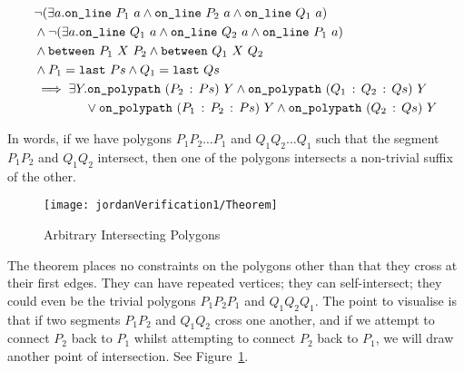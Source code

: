 \begin{equation}\label{eq:intersectPolypathClosed}
  \begin{aligned}
    &\neg(\exists a.\texttt{on\_line}\ P_1\ a\wedge \texttt{on\_line}\ P_2\ a\wedge \texttt{on\_line}\ Q_1\ a)\\
    &\wedge\neg(\exists a.\texttt{on\_line}\ Q_1\ a\wedge \texttt{on\_line}\ Q_2\ a\wedge \texttt{on\_line}\ P_1\ a)\\
    &\wedge\texttt{between}\ P_1\ X\ P_2 \wedge \texttt{between}\ Q_1\ X\ Q_2\\
    &\wedge P_1 = \texttt{last}\ Ps \wedge Q_1 = \texttt{last}\ Qs\\
    &\implies \exists Y. \texttt{on\_polypath}\ (P_2\,:\,Ps)\ Y \wedge \texttt{on\_polypath}\ (Q_1\,:\,Q_2\,:\,Qs)\ Y\\
    &\qquad\qquad\vee \texttt{on\_polypath}\ (P_1\,:\,P_2\,:\,Ps)\ Y \wedge \texttt{on\_polypath}\ (Q_2\,:\,Qs)\ Y\\
  \end{aligned}
\end{equation}

In words, if we have polygons $P_1P_2\ldots P_1$ and $Q_1Q_2\ldots Q_1$ such that the segment $P_1P_2$ and $Q_1Q_2$ intersect, then one of the polygons intersects a non-trivial suffix of the other.

\begin{figure}
\centering\texttt{[image: jordanVerification1/Theorem]}
\caption{Arbitrary Intersecting Polygons}
\label{fig:IntersectingPolygons}
\end{figure}

The theorem places no constraints on the polygons other than that they cross at their first edges. They can have repeated vertices; they can self-intersect; they could even be the trivial polygons $P_1P_2P_1$ and $Q_1Q_2Q_1$. The point to visualise is that if two segments $P_1P_2$ and $Q_1Q_2$ cross one another, and if we attempt to connect $P_2$ back to $P_1$ whilst attempting to connect $P_2$ back to $P_1$, we will draw another point of intersection. See Figure~\ref{fig:IntersectingPolygons}.

